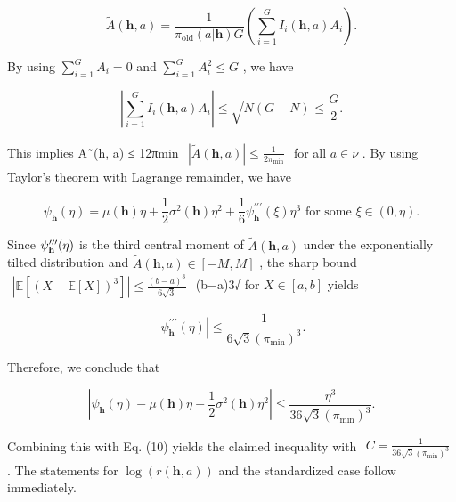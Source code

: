 \documentclass[
  10
]{article}
\begin{document}
\[
\tilde {A} (\mathbf {h}, a) = \frac {1}{\pi_ {\mathrm{old}} (a | \mathbf {h}) G} \left(\sum_ {i = 1} ^ {G} I _ {i} (\mathbf {h}, a) A _ {i}\right).
\]

By using \(\textstyle \sum _ { i = 1 } ^ { G } A _ { i } = 0\) and
\(\textstyle \sum _ { i = 1 } ^ { G } A _ { i } ^ { 2 } \leq G\) , we
have

\[
\left| \sum_ {i = 1} ^ {G} I _ {i} (\mathbf {h}, a) A _ {i} \right| \leq \sqrt {N (G - N)} \leq \frac {G}{2}.
\]

This implies \textbar A˜(h, a)\textbar{} ≤ 12πmin
\(\begin{array} { r } { | \tilde { A } ( \mathbf { h } , a ) | \leq \frac { 1 } { 2 \pi _ { \mathrm { m i n } } } } \end{array}\)
for all \(a \in \nu\) . By using Taylor's theorem with Lagrange
remainder, we have

\[
\psi_ {\mathbf {h}} (\eta) = \mu (\mathbf {h}) \eta + \frac {1}{2} \sigma^ {2} (\mathbf {h}) \eta^ {2} + \frac {1}{6} \psi_ {\mathbf {h}} ^ {\prime \prime \prime} (\xi) \eta^ {3} \text { for some } \xi \in (0, \eta).
\]

Since \(\psi _ { \bf h } ^ { \prime \prime \prime } ( \eta )\) is the
third central moment of \(\tilde { A } ( \mathbf { h } , a )\) under the
exponentially tilted distribution and
\(\tilde { A } ( \mathbf { h } , a ) \in [ - M , M ]\) , the sharp bound
\(\begin{array} { r } { | \mathbb { E } [ ( X - \mathbb { E } [ X ] ) ^ { 3 } ] | \le \frac { ( b - a ) ^ { 3 } } { 6 \sqrt { 3 } } } \end{array}\)
(b−a)3√ for \(X \in [ a , b ]\) yields

\[
| \psi_ {\mathbf {h}} ^ {\prime \prime \prime} (\eta) | \leq \frac {1}{6 \sqrt {3} (\pi_ {\mathrm{min}}) ^ {3}}.
\]

Therefore, we conclude that

\[
\left| \psi_ {\mathbf {h}} (\eta) - \mu (\mathbf {h}) \eta - \frac {1}{2} \sigma^ {2} (\mathbf {h}) \eta^ {2} \right| \leq \frac {\eta^ {3}}{3 6 \sqrt {3} (\pi_ {\min}) ^ {3}}.
\]

Combining this with Eq. (10) yields the claimed inequality with
\(\begin{array} { r } { C = \frac { 1 } { 3 6 \sqrt { 3 } ( \pi _ { \mathrm { m i n } } ) ^ { 3 } } } \end{array}\)
. The statements for \(\log ( r ( \mathbf { h } , a ) )\) and the
standardized case follow immediately.
\end{document}
